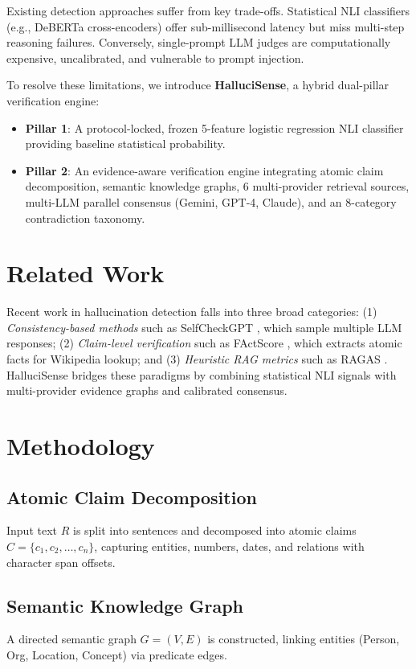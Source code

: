 \documentclass[conference]{IEEEtran}
\begin{document}
Existing detection approaches suffer from key trade-offs. Statistical NLI classifiers (e.g., DeBERTa cross-encoders) offer sub-millisecond latency but miss multi-step reasoning failures. Conversely, single-prompt LLM judges are computationally expensive, uncalibrated, and vulnerable to prompt injection.

To resolve these limitations, we introduce \textbf{HalluciSense}, a hybrid dual-pillar verification engine:
\begin{itemize}
    \item \textbf{Pillar 1}: A protocol-locked, frozen 5-feature logistic regression NLI classifier providing baseline statistical probability.
    \item \textbf{Pillar 2}: An evidence-aware verification engine integrating atomic claim decomposition, semantic knowledge graphs, 6 multi-provider retrieval sources, multi-LLM parallel consensus (Gemini, GPT-4, Claude), and an 8-category contradiction taxonomy.
\end{itemize}

\section{Related Work}
Recent work in hallucination detection falls into three broad categories: (1) \textit{Consistency-based methods} such as SelfCheckGPT \cite{manakul2023selfcheckgpt}, which sample multiple LLM responses; (2) \textit{Claim-level verification} such as FActScore \cite{min2023factscore}, which extracts atomic facts for Wikipedia lookup; and (3) \textit{Heuristic RAG metrics} such as RAGAS \cite{es2023ragas}. HalluciSense bridges these paradigms by combining statistical NLI signals with multi-provider evidence graphs and calibrated consensus.

\section{Methodology}
\subsection{Atomic Claim Decomposition}
Input text $R$ is split into sentences and decomposed into atomic claims $C = \{c_1, c_2, \dots, c_n\}$, capturing entities, numbers, dates, and relations with character span offsets.

\subsection{Semantic Knowledge Graph}
A directed semantic graph $G = (V, E)$ is constructed, linking entities (Person, Org, Location, Concept) via predicate edges.
\end{document}
